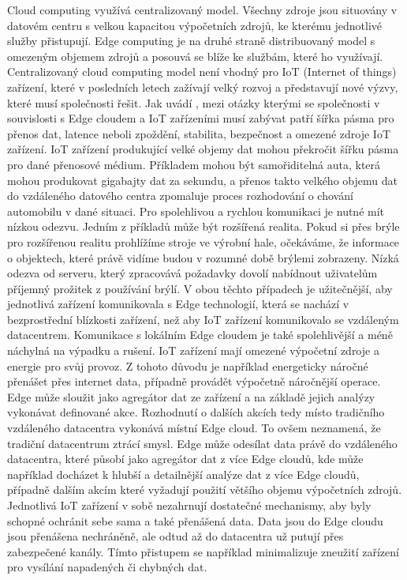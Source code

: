  Cloud computing využívá centralizovaný model. Všechny zdroje jsou situovány \linebreak v datovém centru s velkou kapacitou výpočetních zdrojů, ke kterému jednotlivé služby přistupují. Edge computing je na druhé straně distribuovaný model s omezeným objemem zdrojů a posouvá se blíže ke službám, které ho využívají. Centralizovaný cloud computing model není vhodný pro IoT (Internet of things) zařízení, které v posledních letech zažívají velký rozvoj a představují nové výzvy, které musí společnosti řešit. Jak uvádí \cite{buyya}, mezi otázky kterými se společnosti v souvislosti s Edge cloudem a IoT zařízeními musí zabývat patří šířka pásma pro přenos dat, latence neboli zpoždění, stabilita, bezpečnost a omezené zdroje IoT zařízení. IoT zařízení produkující velké objemy dat mohou překročit šířku pásma pro dané přenosové médium. Příkladem mohou být \linebreak samořiditelná auta, která mohou produkovat gigabajty dat za sekundu, a přenos takto velkého objemu dat do vzdáleného datového centra zpomaluje proces rozhodování o chování automobilu v dané situaci. Pro spolehlivou a rychlou komunikaci je nutné mít nízkou odezvu. Jedním z příkladů může být rozšířená realita. Pokud si přes brýle pro rozšířenou realitu prohlížíme stroje ve výrobní hale, očekáváme, že informace o objektech, které právě vidíme budou v rozumné době brýlemi zobrazeny. Nízká odezva od serveru, který zpracovává požadavky dovolí nabídnout uživatelům příjemný prožitek z používání brýlí. V obou těchto případech je užitečnější, aby jednotlivá zařízení komunikovala s Edge technologií, která se nachází v bezprostřední blízkosti zařízení, než aby IoT zařízení komunikovalo se vzdáleným datacentrem. Komunikace s lokálním Edge cloudem je také spolehlivější a méně náchylná na výpadku a rušení. IoT zařízení mají omezené výpočetní zdroje a energie pro svůj provoz. Z tohoto důvodu je například energeticky náročné přenášet přes internet data, případně provádět výpočetně náročnější operace. Edge může sloužit jako agregátor dat ze zařízení a na základě jejich analýzy vykonávat definované akce. Rozhodnutí o dalších akcích tedy místo tradičního vzdáleného datacentra vykonává místní Edge cloud. To ovšem neznamená, že tradiční datacentrum ztrácí smysl. Edge může odesílat data právě do vzdáleného datacentra, které působí jako agregátor dat z více Edge cloudů, kde může například docházet k hlubší a detailnější analýze dat z více Edge cloudů, případně dalším akcím které vyžadují použití většího objemu výpočetních zdrojů. Jednotlivá IoT zařízení v sobě nezahrnují dostatečné mechanismy, aby byly schopné \linebreak ochránit sebe sama a také přenášená data. Data jsou do Edge cloudu jsou přenášena nechráněně, ale odtud až do datacentra už putují přes zabezpečené kanály. Tímto přistupem se například minimalizuje zneužití zařízení pro vysílání napadených či chybných dat. \par
